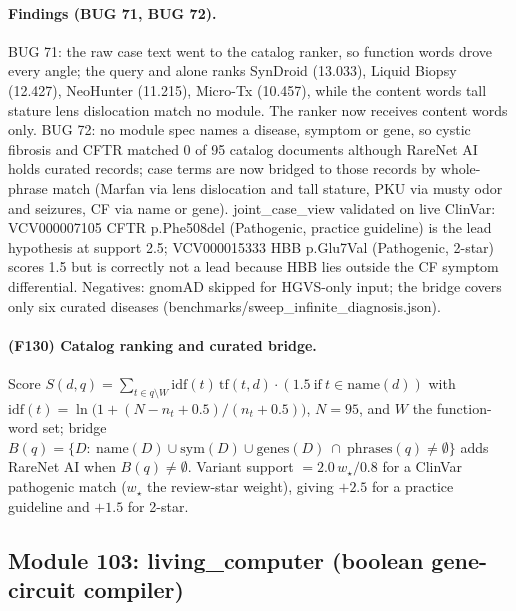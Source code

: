 \paragraph{Findings (BUG 71, BUG 72).} BUG 71: the raw case text went to the catalog ranker, so function words drove every angle; the query and alone ranks SynDroid (13.033), Liquid Biopsy (12.427), NeoHunter (11.215), Micro-Tx (10.457), while the content words tall stature lens dislocation match no module. The ranker now receives content words only. BUG 72: no module spec names a disease, symptom or gene, so cystic fibrosis and CFTR matched 0 of 95 catalog documents although RareNet AI holds curated records; case terms are now bridged to those records by whole-phrase match (Marfan via lens dislocation and tall stature, PKU via musty odor and seizures, CF via name or gene). joint\_case\_view validated on live ClinVar: VCV000007105 CFTR p.Phe508del (Pathogenic, practice guideline) is the lead hypothesis at support 2.5; VCV000015333 HBB p.Glu7Val (Pathogenic, 2-star) scores 1.5 but is correctly not a lead because HBB lies outside the CF symptom differential. Negatives: gnomAD skipped for HGVS-only input; the bridge covers only six curated diseases (benchmarks/sweep\_infinite\_diagnosis.json).
\paragraph{(F130) Catalog ranking and curated bridge.} Score $S(d,q)=\sum_{t\in q\setminus W}\mathrm{idf}(t)\,\mathrm{tf}(t,d)\cdot(1.5\ \mathrm{if}\ t\in\mathrm{name}(d))$ with $\mathrm{idf}(t)=\ln\!\bigl(1+(N-n_t+0.5)/(n_t+0.5)\bigr)$, $N=95$, and $W$ the function-word set; bridge $B(q)=\{D:\ \mathrm{name}(D)\cup\mathrm{sym}(D)\cup\mathrm{genes}(D)\ \cap\ \mathrm{phrases}(q)\neq\emptyset\}$ adds RareNet AI when $B(q)\neq\emptyset$. Variant support $=2.0\,w_\star/0.8$ for a ClinVar pathogenic match ($w_\star$ the review-star weight), giving $+2.5$ for a practice guideline and $+1.5$ for 2-star.
\subsection{Module 103: living\_computer (boolean gene-circuit compiler)}
